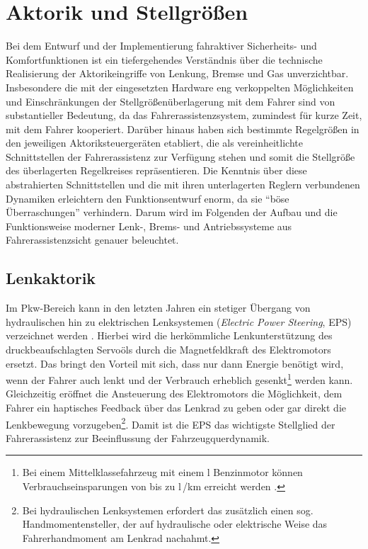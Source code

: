 \section{Aktorik und Stellgrößen} \label{sec:aktuatorik}
Bei dem Entwurf und der Implementierung fahraktiver Sicherheits- und Komfortfunktionen ist ein tiefergehendes Verständnis über die technische Realisierung der Aktorikeingriffe von Lenkung, Bremse und Gas unverzichtbar. Insbesondere die mit der eingesetzten Hardware eng verkoppelten Möglichkeiten und Einschränkungen der Stellgrößenüberlagerung mit dem Fahrer sind von substantieller Bedeutung, da das Fahrerassistenzsystem, zumindest für kurze Zeit, mit dem Fahrer kooperiert. Darüber hinaus haben sich bestimmte Regelgrößen in den jeweiligen Aktoriksteuergeräten etabliert, die als vereinheitlichte Schnittstellen der Fahrerassistenz zur Verfügung stehen und somit die Stellgröße des überlagerten Regelkreises repräsentieren. Die Kenntnis über diese abstrahierten Schnittstellen und die mit ihren unterlagerten Reglern verbundenen Dynamiken erleichtern den Funktionsentwurf enorm, da sie "`böse Überraschungen"' verhindern. Darum wird im Folgenden der Aufbau und die Funktionsweise moderner Lenk-, Brems- und Antriebssysteme aus Fahrerassistenzsicht genauer beleuchtet.

\subsection{Lenkaktorik}
Im Pkw-Bereich kann in den letzten Jahren ein stetiger Übergang von hydraulischen  hin zu elektrischen Lenksystemen (\emph{Electric Power Steering}, EPS) verzeichnet werden \cite{karch2007mechatronische}. Hierbei wird die herkömmliche Lenkunterstützung des druckbeaufschlagten Servoöls durch die Magnetfeldkraft des Elektromotors ersetzt. %
Das bringt den Vorteil mit sich, dass nur dann Energie benötigt wird, wenn der Fahrer auch lenkt und der Verbrauch erheblich gesenkt\footnote{Bei einem Mittelklassefahrzeug mit einem \unit[2,0]{l} Benzinmotor können Verbrauchseinsparungen von bis zu \unit[0,5]{l}\,/\unit[100]{km} erreicht werden \cite{pfeffer2013lenkungshandbuch}.} werden kann. \\ 
Gleichzeitig eröffnet die Ansteuerung des Elektromotors die Möglichkeit, dem Fahrer ein haptisches Feedback über das Lenkrad zu geben oder gar direkt die Lenkbewegung vorzugeben\footnote{Bei hydraulischen Lenksystemen erfordert das zusätzlich einen sog.\, Handmomentensteller, der auf hydraulische oder elektrische Weise das Fahrerhandmoment am Lenkrad nachahmt.}. Damit ist die EPS das wichtigste Stellglied der Fahrerassistenz zur Beeinflussung der Fahrzeugquerdynamik. %
